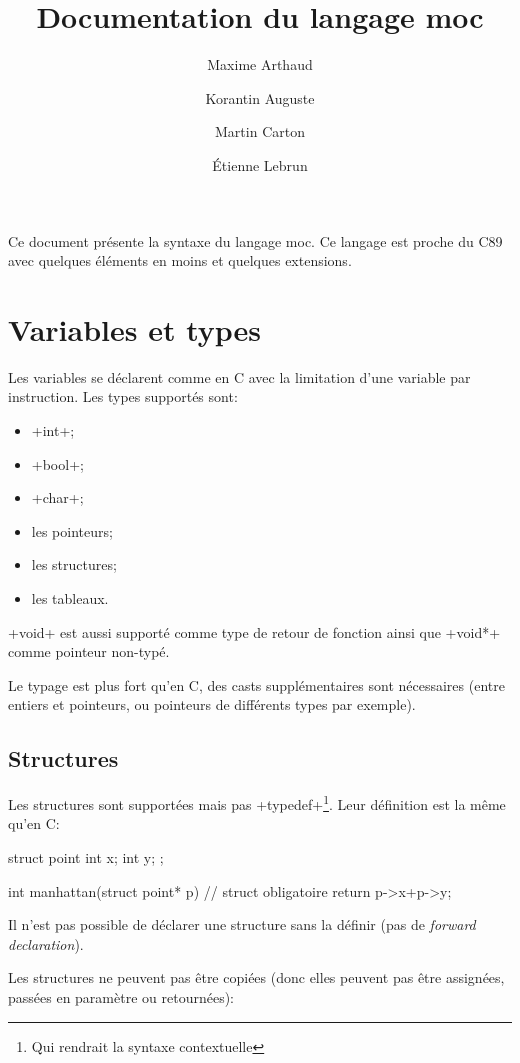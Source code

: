 \documentclass[a4paper]{article}
\author{
       Maxime Arthaud
  \and Korantin Auguste
  \and Martin Carton
  \and Étienne Lebrun
}
\title{Documentation du langage moc}
\begin{document}
  \maketitle
  \tableofcontents
  \newpage

  Ce document présente la syntaxe du langage moc. Ce langage est proche du C89
  avec quelques éléments en moins et quelques extensions.

  \section{Variables et types}
    Les variables se déclarent comme en C avec la limitation d'une variable par
    instruction. Les types supportés sont:
    \begin{itemize}
      \item \imoc+int+;
      \item \imoc+bool+;
      \item \imoc+char+;
      \item les pointeurs;
      \item les structures;
      \item les tableaux.
    \end{itemize}

    \imoc+void+ est aussi supporté comme type de retour de fonction ainsi que
    \imoc+void*+ comme pointeur non-typé.

    Le typage est plus fort qu'en C, des casts supplémentaires sont nécessaires
    (entre entiers et pointeurs, ou pointeurs de différents types par exemple).

    \subsection{Structures}
      Les structures sont supportées mais pas \imoc+typedef+\footnote{Qui
      rendrait la syntaxe contextuelle}. Leur définition est la même qu'en C:

      \begin{moc}
struct point {
    int x;
    int y;
};

int manhattan(struct point* p) { // struct obligatoire
    return p->x+p->y;
}
      \end{moc}

      Il n'est pas possible de déclarer une structure sans la définir (pas de
      \emph{forward declaration}).

      Les structures ne peuvent pas être copiées (donc elles peuvent pas être
      assignées, passées en paramètre ou retournées):
\end{document}
